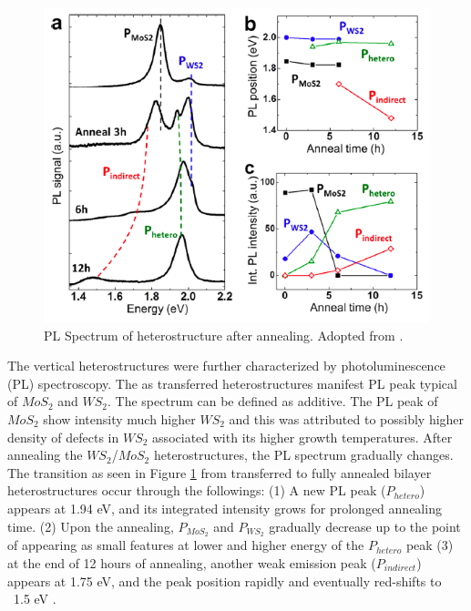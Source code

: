 \begin{figure}[h]
	\begin{center}
		\includegraphics[scale=1]{Heterostructures/HeterostructurePLSpectrumIntro.png}
		\caption{PL Spectrum of heterostructure after annealing. Adopted from \cite{Tongay2014}.}
		\label{fig:HeterostructurePLSpectrumIntro}
	\end{center}
\end{figure}

The vertical heterostructures were further characterized by photoluminescence (PL) spectroscopy.
The as transferred heterostructures manifest PL peak typical of $MoS_2$ and $WS_2$. The spectrum can be defined as additive. The PL peak of $MoS_2$ show intensity much higher $WS_2$ and this was attributed to possibly higher density of defects in $WS_2$ associated with its higher growth temperatures. After annealing the $WS_2$/$MoS_2$ heterostructures, the PL spectrum gradually changes. The transition as seen in Figure \ref{fig:HeterostructurePLSpectrumIntro} from transferred to fully annealed bilayer heterostructures occur through the followings: (1) A new PL peak ($P_{hetero}$) appears at 1.94 eV, and its integrated intensity grows for prolonged annealing time. (2) Upon the annealing, $P_{MoS_2}$ and $P_{WS_2}$ gradually decrease up to the point of appearing as small features at lower and higher energy of the $P_{hetero}$ peak (3) at the end of 12 hours of annealing, another weak emission peak ($P_{indirect}$) appears at 1.75 eV, and the peak position rapidly and eventually red-shifts to ~1.5 eV \cite{Tongay2014}. 

